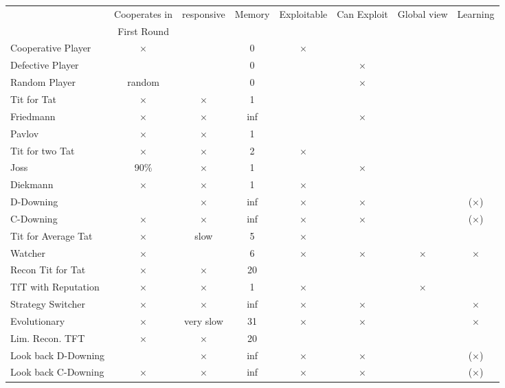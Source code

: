 \documentclass[11pt,twoside]{article}
\begin{document}
\begin{landscape}

\pagestyle{empty}

\begin{tabular}[]{|l|c|c|c|c|c|c|c|}
  \hline
  			& Cooperates in&responsive& Memory	&Exploitable	& Can Exploit&Global view	&Learning	\\
  			&  First Round&		&      		&		&		&		&		\\
  \hline
  Cooperative Player& $\times$	&		&0		&$\times$	&		&		&		\\
 \hline
  Defective Player 	&  		&		&0		&		&$\times$	&		&		\\
 \hline  
Random Player 	& random	&		&0		&		&$\times$	&		&		\\
 \hline  
Tit for Tat 		& $\times$	&$\times$	&1		&		&		&		&		\\
 \hline
  Friedmann 		& $\times$	&$\times$	&inf		&		&$\times$	&		&		\\
 \hline
 Pavlov		& $\times$	&$\times$	&1		&		&		&		&		\\
 \hline
Tit for two Tat	& $\times$	&$\times$	&2		&$\times$	&		&		&		\\
 \hline
 Joss 			& 90\%	&$\times$	&1		&		&$\times$	&		&		\\
 \hline
Diekmann 		& $\times$	&$\times$	&1		&$\times$	&		&		&		\\
 \hline
D-Downing 		&  		&$\times$	&inf		&$\times$	&$\times$	&		&($\times$)	\\
 \hline
C-Downing 		& $\times$	&$\times$	&inf		&$\times$	&$\times$	&		&($\times$)	\\
 \hline
Tit for Average Tat	& $\times$	&slow		&5		&$\times$	&		&		&		\\
 \hline
Watcher 		& $\times$	&		&6		&$\times$	&$\times$	&$\times$	&$\times$	\\
 \hline
Recon Tit for Tat	& $\times$	&$\times$	&20		&		&		&		&		\\
 \hline
TfT with Reputation& $\times$	&$\times$	&1		&$\times$	&		&$\times$	&		\\
 \hline
Strategy Switcher	& $\times$	&$\times$	&inf		&$\times$	&$\times$	&		&$\times$	\\
 \hline
Evolutionary		& $\times$	&very slow	&31		&$\times$	&$\times$	&		&$\times$	\\
 \hline
Lim. Recon. TFT	& $\times$	&$\times$	&20		&		&		&		&		\\
 \hline
Look back D-Downing& 		&$\times$	&inf		&$\times$	&$\times$	&		&($\times$)	\\
 \hline
Look back C-Downing& $\times$	&$\times$	&inf		&$\times$	&$\times$	&		&($\times$)	\\
 \hline
\end{tabular}

\end{landscape}
\end{document}
